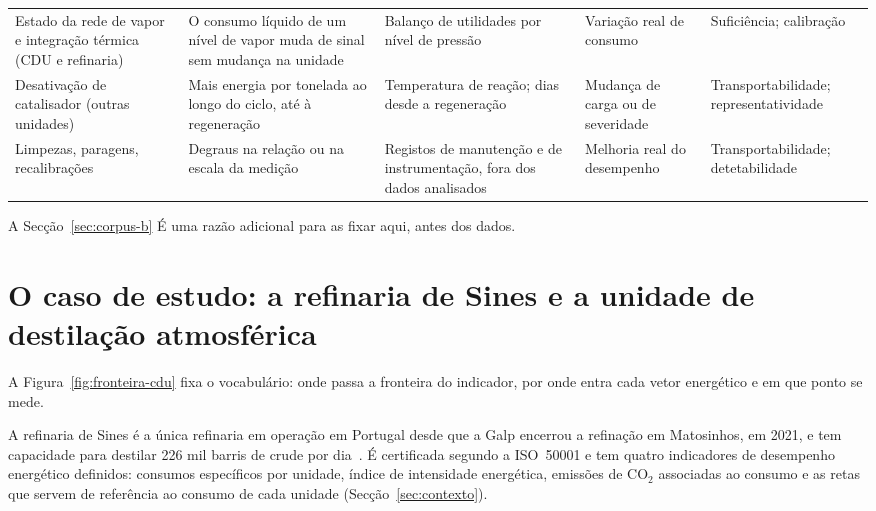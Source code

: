 \begin{table}[htbp]
\begin{tabularx}{\textwidth}{@{}>{\raggedright\arraybackslash}p{2.3cm} >{\raggedright\arraybackslash}X >{\raggedright\arraybackslash}X >{\raggedright\arraybackslash}X >{\raggedright\arraybackslash}p{2.1cm}@{}}
    \addlinespace
    Estado da rede de vapor e integração térmica (CDU e refinaria) & O consumo líquido de um nível de vapor muda de sinal sem mudança na unidade & Balanço de utilidades por nível de pressão & Variação real de consumo & Suficiência; calibração \\
    \addlinespace
    Desativação de catalisador (outras unidades) & Mais energia por tonelada ao longo do ciclo, até à regeneração & Temperatura de reação; dias desde a regeneração & Mudança de carga ou de severidade & Transportabilidade; representatividade \\
    \addlinespace
    Limpezas, paragens, recalibrações & Degraus na relação ou na escala da medição & Registos de manutenção e de instrumentação, fora dos dados analisados & Melhoria real do desempenho & Transportabilidade; detetabilidade \\
    \bottomrule
  \end{tabularx}
\end{table}

A Secção~\ref{sec:corpus-b}  É uma razão adicional para as fixar
aqui, antes dos dados.

\section{O caso de estudo: a refinaria de Sines e a unidade de destilação atmosférica}
\label{sec:caso-estudo}
A Figura~\ref{fig:fronteira-cdu} fixa o vocabulário: onde passa a fronteira do indicador, por onde entra cada vetor energético e em que ponto se mede.



A refinaria de Sines é a única refinaria em operação em Portugal desde que a
Galp encerrou a refinação em Matosinhos, em 2021, e tem capacidade para
destilar 226 mil barris de crude por dia~\cite{Galp2026Industrial}. É certificada
segundo a ISO~50001 e tem quatro indicadores de desempenho energético
definidos: consumos específicos por unidade, índice de intensidade
energética, emissões de CO$_2$ associadas ao consumo e as retas que servem
de referência ao consumo de cada unidade (Secção~\ref{sec:contexto}).

